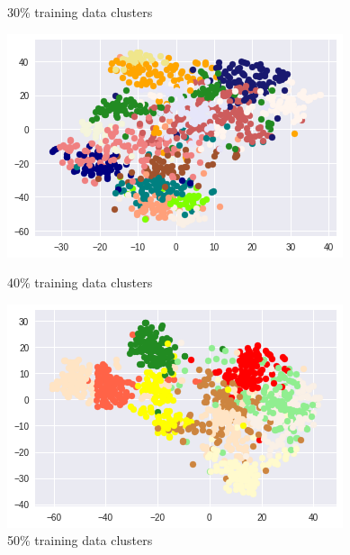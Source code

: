 \documentclass{article}
\begin{document}
\begin{figure}[!htb]
	\caption{30\% training data clusters}\label{fig:part_2_task_5_cluster_30}
	\endminipage\hfill
	\includegraphics[width=\linewidth]{../output_plots/CIFAR/clustering/cluster-dstribution-40.png}
	\caption{40\% training data clusters}\label{fig:part_2_task_5_cluster_40}
	\endminipage
	\includegraphics[width=\linewidth]{../output_plots/CIFAR/clustering/cluster-dstribution-50.png}
	\caption{50\% training data clusters}\label{fig:part_2_task_5_cluster_50}
	\endminipage
\end{figure}
\end{document}

